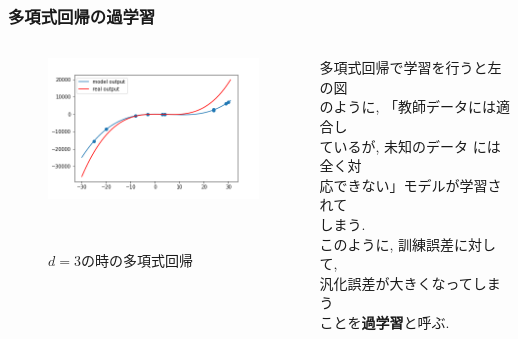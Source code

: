 \documentclass[dvipdfmx,11pt]{beamer}		%
\begin{document}
    \begin{frame}
        \frametitle{多項式回帰の過学習}
        \begin{columns}[t]
            \begin{column}{0.65\textwidth} 
                \begin{figure}
                    \centering
                    \includegraphics[width = 6.8cm]{Image/overfitting.png}
                    \caption{$d = 3$の時の多項式回帰}
              　\end{figure}
            \end{column}
            \begin{column}{0.75\textwidth}
                多項式回帰で学習を行うと左の図\\
                のように, 「教師データには適合し\\ているが, 未知のデータ
                には全く対\\応できない」モデルが学習されて\\しまう. \\
                \indent
                このように, 訓練誤差に対して, \\
                汎化誤差が大きくなってしまう\\
                ことを\textbf{過学習}と呼ぶ. 
            \end{column}
        \end{columns}
    \end{frame}
\end{document}

